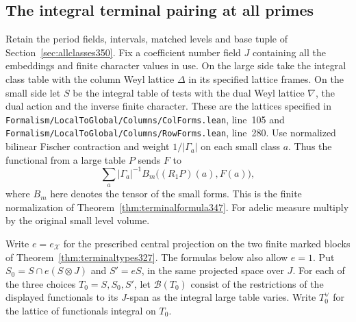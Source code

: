 \documentclass[a4paper,11pt]{article}
\theoremstyle{definition}
\theoremstyle{remark}
\newcommand{\srcloc}[2]{{\small\nolinkurl{#1.lean}}, line~#2}
\numberwithin{equation}{section}
\begin{document}
\subsection{The integral terminal pairing at all primes}\label{sec:weylperiod351}

Retain the period fields, intervals, matched levels and base tuple
of Section~\ref{sec:allclasses350}. Fix a coefficient number
field \(J\) containing all the embeddings and finite character
values in use. On the large side take the integral class table
with the column Weyl lattice \(\Delta\) in its specified lattice
frames. On the small side let \(S\) be the integral table of
tests with the dual Weyl lattice \(\nabla\), the dual action and
the inverse finite character. These are the lattices specified
in \srcloc{Formalism/LocalToGlobal/Columns/ColForms}{105}
and \srcloc{Formalism/LocalToGlobal/Columns/RowForms}{280}.
Use normalized bilinear Fischer contraction and weight
\(1/|\Gamma_a|\) on each small class \(a\). Thus the functional
from a large table \(P\) sends \(F\) to
\[
            \sum_a |\Gamma_a|^{-1}
                          B_m\big((R_1P)(a),F(a)\big),
\]
where \(B_m\) here denotes the tensor of the small forms.
This is the finite normalization of Theorem~\ref{thm:terminalformula347}.
For adelic measure multiply by the original small level volume.

Write \(e=e_{\mathcal X}\) for the prescribed central projection
on the two finite marked blocks of Theorem~\ref{thm:terminaltypes327}.
The formulas below also allow \(e=1\).
Put \(S_0=S\cap e(S\otimes J)\) and \(S'=eS\), in the same
projected space over \(J\). For each of the three choices
\(T_0=S,S_0,S'\), let \(\mathcal B(T_0)\) consist of the
restrictions of the displayed functionals to its \(J\)-span as
the integral large table varies. Write \(T_0^\vee\) for the
lattice of functionals integral on \(T_0\).
\end{document}
